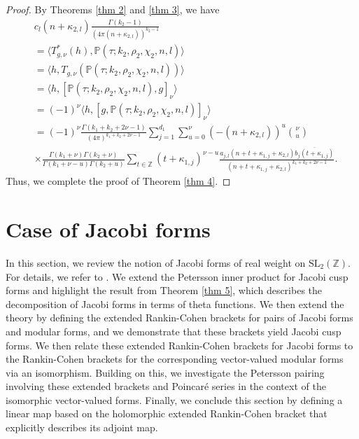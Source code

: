 \documentclass[11pt]{amsart}
\theoremstyle{definition}
\theoremstyle{remark}
\numberwithin{equation}{section}
\renewcommand{\(}{\left(}
\renewcommand{\)}{\right)}
\begin{document}
\begin{proof}
By Theorems \ref{thm 2} and \ref{thm 3}, we have
\begin{equation*}
\begin{aligned}
    &c_l(n+\kappa_{2,l})\frac{\Gamma(k_2-1)}{(4\pi(n+\kappa_{2,l}))^{k_2-1}}\\
    &=\langle T_{g,\nu}^{*}(h),\mathbb{P}(\tau;k_2,\rho_2,\chi_2,n,l) \rangle\\
    &=\langle h, T_{g,\nu}(\mathbb{P}(\tau;k_2,\rho_2,\chi_2,n,l)) \rangle\\
    &= \langle h, [\mathbb{P}(\tau;k_2,\rho_2,\chi_2,n,l),g]_{\nu} \rangle\\
    &= (-1)^{\nu}\langle h, [g,\mathbb{P}(\tau;k_2,\rho_2,\chi_2,n,l)]_{\nu} \rangle\\
    &= (-1)^{\nu}\frac{\Gamma(k_1+k_2+2\nu-1)}{(4\pi)^{k_1+k_2+2\nu-1}}\sum_{j=1}^{d_1}\sum_{u=0}^{\nu} (-(n+\kappa_{2,l}))^{u}\binom{\nu}{u}\\
            &\times\frac{\Gamma(k_1+\nu)\Gamma(k_2+\nu)}{\Gamma(k_1+\nu-u)\Gamma(k_2+u)}\sum_{t\in \mathbb{Z}} (t+\kappa_{1,j})^{\nu-u}\frac{a_{j,l}(n+t+\kappa_{1,j}+\kappa_{2,l})\overline{b_j(t+\kappa_{1,j})}}{(n+t+\kappa_{1,j}+\kappa_{2,l})^{k_1+k_2+2\nu-1}}.
\end{aligned}
\end{equation*}
Thus, we complete the proof of Theorem \ref{thm 4}.
\end{proof}

\section{Case of Jacobi forms}\label{s : Jacobi forms}

In this section, we review the notion of Jacobi forms of real weight on $\mathrm{SL}_{2}(\mathbb{Z})$.
For details, we refer to \cite[Section 2]{LL}.  We extend the Petersson inner product for Jacobi cusp forms and highlight the result from Theorem \ref{thm 5}, which describes the decomposition of Jacobi forms in terms of theta functions.  We then extend the theory by defining the extended Rankin-Cohen brackets for pairs of Jacobi forms and modular forms, and we demonstrate that these brackets yield Jacobi cusp forms. We then relate these extended Rankin-Cohen brackets for Jacobi forms to the Rankin-Cohen brackets for the corresponding vector-valued modular forms via an isomorphism. Building on this, we investigate the Petersson pairing involving these extended brackets and Poincaré series in the context of the isomorphic vector-valued forms. Finally, we conclude this section by defining a linear map based on the holomorphic extended Rankin-Cohen bracket that explicitly describes its adjoint map.
\end{document}
